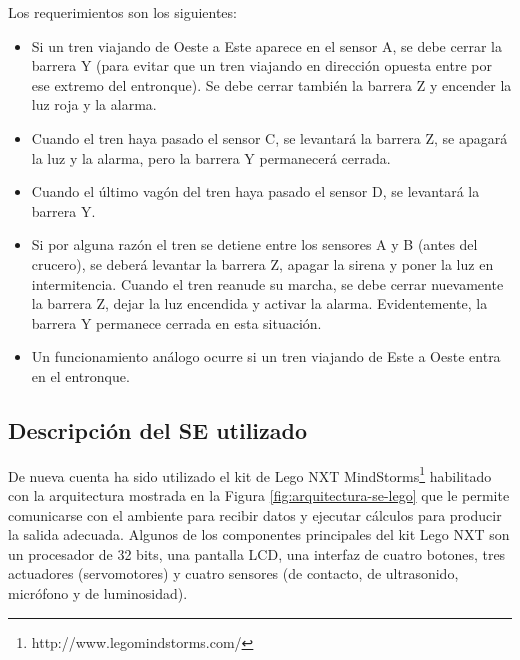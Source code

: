 \documentclass[journal]{IEEEtran}
\begin{document}
Los requerimientos son los siguientes:
\begin{itemize}
	\item Si un tren viajando de Oeste a Este aparece en el sensor A, se debe cerrar la barrera Y (para evitar que un tren viajando en dirección opuesta entre por ese extremo del entronque).
	Se debe cerrar también la barrera Z y encender la luz roja y la alarma.

	\item Cuando el tren haya pasado el sensor C, se levantará la barrera Z, se apagará la luz y la alarma, pero la barrera Y permanecerá cerrada.

	\item Cuando el último vagón del tren haya pasado el sensor D, se levantará la barrera Y.

	\item Si por alguna razón el tren se detiene entre los sensores A y B (antes del crucero), se deberá levantar la barrera Z, apagar la sirena y poner la luz en intermitencia.
	Cuando el tren reanude su marcha, se debe cerrar nuevamente la barrera Z, dejar la luz encendida y activar la alarma.
	Evidentemente, la barrera Y permanece cerrada en esta situación.

	\item Un funcionamiento análogo ocurre si un tren viajando de Este a Oeste entra en el entronque.
\end{itemize}


\subsection{Descripción del SE utilizado}
\label{sub:metodologia-descripcion-SE}

De nueva cuenta ha sido utilizado el kit de Lego NXT MindStorms\footnote{http://www.legomindstorms.com/} habilitado con la arquitectura mostrada en la Figura \ref{fig:arquitectura-se-lego} que le permite comunicarse con el ambiente para recibir datos y ejecutar cálculos para producir la salida adecuada. Algunos de los componentes principales del kit Lego NXT son un procesador de 32 bits, una pantalla LCD, una interfaz de cuatro botones, tres actuadores (servomotores) y cuatro sensores (de contacto, de ultrasonido, micrófono y de luminosidad).
\end{document}
